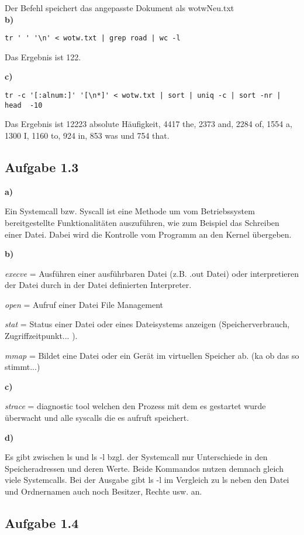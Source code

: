 \documentclass[a4paper,graphics,11pt]{article}
\newcommand{\aufgabe}[1]{\subsection*{Aufgabe #1}}
\begin{document}
Der Befehl speichert das angepasste Dokument als wotwNeu.txt\\


\textbf{b)}

\begin{verbatim}
tr ' ' '\n' < wotw.txt | grep road | wc -l
\end{verbatim}



Das Ergebnis ist 122.

\textbf{c)}

\begin{verbatim}
tr -c '[:alnum:]' '[\n*]' < wotw.txt | sort | uniq -c | sort -nr | head  -10
\end{verbatim}


Das Ergebnis ist 12223 absolute Häufigkeit, 4417 the, 2373 and, 2284 of, 1554 a, 1300 I, 1160 to, 924 in, 853 was und 754 that.

\aufgabe{1.3}
\textbf{a)}

Ein Systemcall bzw. Syscall ist eine Methode um vom Betriebssystem bereitgestellte Funktionalitäten auszuführen, wie zum Beispiel das Schreiben einer Datei. Dabei wird die Kontrolle vom Programm an den Kernel übergeben.

\textbf{b)}

\textit{execve} = Ausführen einer ausführbaren Datei (z.B. .out Datei) oder interpretieren der Datei durch in der Datei definierten Interpreter.

\textit{open} = Aufruf einer Datei File Management

\textit{stat} = Status einer Datei oder eines Dateisystems anzeigen (Speicherverbrauch, Zugriffzeitpunkt... ).

\textit{mmap} = Bildet eine Datei oder ein Gerät im virtuellen Speicher ab. (ka ob das so stimmt...)


\textbf{c)}

\textit{strace} = diagnostic tool welchen den Prozess mit dem es gestartet wurde überwacht und alle syscalls die es aufruft speichert.

\newpage

\textbf{d)}

Es gibt zwischen ls und ls -l bzgl. der Systemcall nur Unterschiede in den Speicheradressen und deren Werte. Beide Kommandos nutzen demnach gleich viele Systemcalls. Bei der Ausgabe gibt ls -l im Vergleich zu ls neben den Datei und Ordnernamen auch noch Besitzer, Rechte usw. an.

\aufgabe{1.4}
\end{document}
